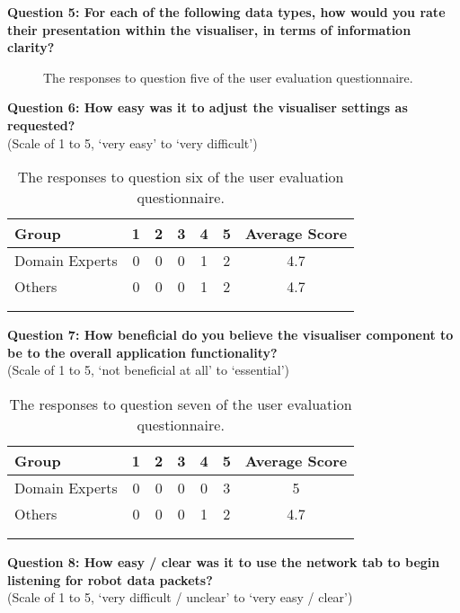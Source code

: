 \clearpage
\noindent\textbf{Question 5: For each of the following data types, how would you rate their presentation within the visualiser, in terms of information clarity?}

\begin{figure}[h]
	\centering
	\decoRule
	\caption[User Evaluation Question 5 Responses]{The responses to question five of the user evaluation questionnaire.}
	\label{fig:VisualisationLikert}
\end{figure}

\noindent\textbf{Question 6: How easy was it to adjust the visualiser settings as requested?}\\(Scale of 1 to 5, `very easy' to `very difficult')

\begin{longtable}{ l c c c c c c }
 \textbf{Group} & \textbf{1} & \textbf{2} & \textbf{3} & \textbf{4} & \textbf{5} & \textbf{Average Score} \\ 
 \hline
 Domain Experts & 0 & 0 & 0 & 1 & 2 & 4.7 \\
 Others 		& 0 & 0 & 0 & 1 & 2 & 4.7 \\
 \bottomrule
\caption[User Evaluation Question 6 Responses]{The responses to question six of the user evaluation questionnaire.}\\
\label{tab:EvaluationQuestionSix}
\end{longtable}

\noindent\textbf{Question 7: How beneficial do you believe the visualiser component to be to the overall application functionality?}\\(Scale of 1 to 5, `not beneficial at all' to `essential')

\begin{longtable}{ l c c c c c c }
 \textbf{Group} & \textbf{1} & \textbf{2} & \textbf{3} & \textbf{4} & \textbf{5} & \textbf{Average Score} \\ 
 \hline
 Domain Experts & 0 & 0 & 0 & 0 & 3 & 5 \\
 Others 		& 0 & 0 & 0 & 1 & 2 & 4.7 \\
 \bottomrule
\caption[User Evaluation Question 7 Responses]{The responses to question seven of the user evaluation questionnaire.}\\
\label{tab:EvaluationQuestionSeven}
\end{longtable}

\noindent\textbf{Question 8: How easy / clear was it to use the network tab to begin listening for robot data packets?}\\(Scale of 1 to 5, `very difficult / unclear' to `very easy / clear')

